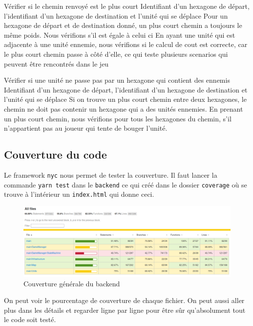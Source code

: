 \mytest
{Vérifier si le chemin renvoyé est le plus court}
{Identifiant d'un hexagone de départ, l'identifiant d'un hexagone de destination et l'unité qui se déplace}
{Pour un hexagone de départ et de destination donné, un plus court chemin a toujours le même poids. Nous vérifions
    s'il est égale à celui ci}
{En ayant une unité qui est adjacente à une unité ennemie, nous vérifions si le calcul de cout est correcte, car
    le plus court chemin passe à côté d'elle, ce qui teste plusieurs scenarios qui peuvent être rencontrés dans le jeu}

\mytest
{Vérifier si une unité ne passe pas par un hexagone qui contient des ennemis}
{Identifiant d'un hexagone de départ, l'identifiant d'un hexagone de destination et l'unité qui se déplace}
{Si on trouve un plus court chemin entre deux hexagones, le chemin ne doit pas contenir un hexagone qui a des
    unités ennemies.}
{En prenant un plus court chemin, nous vérifions pour tous les hexagones du chemin, s'il n'appartient pas
    au joueur qui tente de bouger l'unité.}

\subsection{Couverture du code}

Le framework {\tt nyc} nous permet de tester la couverture. Il faut lancer la commande {\tt yarn test} dans le \lstinline{backend} ce qui créé dans le dossier \lstinline{coverage} où se trouve à l'intérieur un \lstinline{index.html} qui donne ceci.

\begin{figure}[H]
    \centering
    \includegraphics[scale=0.35]{data/couverture_test_1.png}
    \caption{Couverture générale du backend}
\end{figure}

On peut voir le pourcentage de couverture de chaque fichier. On peut aussi aller plus dans les détails et regarder ligne par ligne pour être sûr qu'absolument tout le code soit testé.

